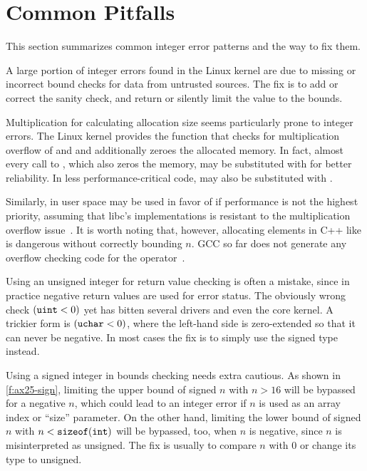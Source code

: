 \section{Common Pitfalls}
\label{s:common}

This section summarizes common integer error patterns and the way
to fix them.

A large portion of integer errors found in the Linux kernel are due
to missing or incorrect bound checks for data from untrusted sources.
The fix is to add or correct the sanity check, and return 
or silently limit the value to the bounds.

Multiplication for calculating allocation size seems particularly
prone to integer errors.  The Linux kernel provides the function
 that checks for multiplication overflow
of  and  and additionally zeroes the allocated
memory.  In fact, almost every call to ,
which also zeros the memory, may be substituted with 
for better reliability.  In less performance-critical code,
 may also be substituted with .

Similarly, in user space  may be used in favor of
 if performance is not the highest priority,
assuming that libc's  implementations is resistant
to the multiplication overflow issue~\cite{rus-cert:calloc}.  It
is worth noting that, however, allocating elements in C++ like  is dangerous without correctly bounding $n$.  GCC so far
does not generate any overflow checking code for the 
operator~\cite{gcc-new}.

Using an unsigned integer for return value checking is often a mistake,
since in practice negative return values are used for error status.
The obviously wrong check $(\texttt{uint} < 0)$ yet has bitten several
drivers and even the core kernel.  A trickier form is $(\texttt{uchar}
< 0)$, where the left-hand side is zero-extended so that it can
never be negative.  In most cases the fix is to simply use the
signed type instead.

Using a signed integer in bounds checking needs extra cautious.  As
shown in \autoref{f:ax25-sign}, limiting the upper bound of signed
$n$ with $n > 16$ will be bypassed for a negative $n$, which could
lead to an integer error if $n$ is used as an array index or ``size''
parameter.  On the other hand, limiting the lower bound of signed
$n$ with $n < \texttt{sizeof}(\texttt{int})$ will be bypassed, too, when
$n$ is negative, since $n$ is misinterpreted as unsigned.  The fix
is usually to compare $n$ with 0 or change its type to unsigned.

